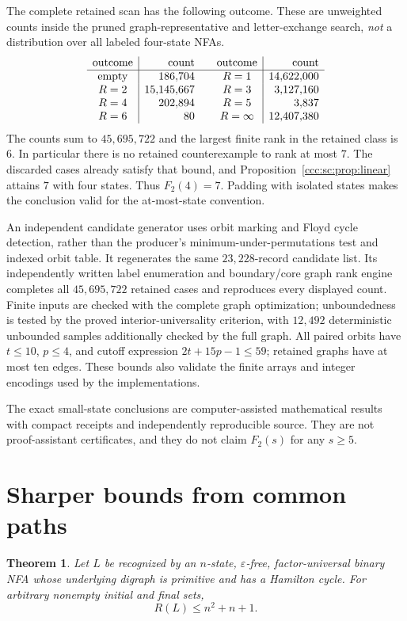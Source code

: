\documentclass[11pt,letterpaper]{article}
\newtheorem{theorem}{Theorem}[section]
\theoremstyle{definition}
\theoremstyle{remark}
\newcommand{\eps}{\varepsilon}
\begin{document}
The complete retained scan has the following outcome. These are unweighted counts inside the pruned graph-representative and letter-exchange search, \emph{not} a distribution over all labeled four-state NFAs.
\[
\begin{array}{c|r@{\qquad}c|r}
\text{outcome}&\text{count}&\text{outcome}&\text{count}\\\hline
\text{empty}&186{,}704&R=1&14{,}622{,}000\\
R=2&15{,}145{,}667&R=3&3{,}127{,}160\\
R=4&202{,}894&R=5&3{,}837\\
R=6&80&R=\infty&12{,}407{,}380
\end{array}
\]
The counts sum to $45{,}695{,}722$ and the largest finite rank in the retained class is $6$. In particular there is no retained counterexample to rank at most $7$. The discarded cases already satisfy that bound, and Proposition~\ref{ccc:sc:prop:linear} attains $7$ with four states. Thus $F_2(4)=7$. Padding with isolated states makes the conclusion valid for the at-most-state convention.

An independent candidate generator uses orbit marking and Floyd cycle detection, rather than the producer's minimum-under-permutations test and indexed orbit table. It regenerates the same $23{,}228$-record candidate list. Its independently written label enumeration and boundary/core graph rank engine completes all $45{,}695{,}722$ retained cases and reproduces every displayed count. Finite inputs are checked with the complete graph optimization; unboundedness is tested by the proved interior-universality criterion, with $12{,}492$ deterministic unbounded samples additionally checked by the full graph. All paired orbits have $t\le10$, $p\le4$, and cutoff expression $2t+15p-1\le59$; retained graphs have at most ten edges. These bounds also validate the finite arrays and integer encodings used by the implementations.

The exact small-state conclusions are computer-assisted mathematical results with compact receipts and independently reproducible source. They are not proof-assistant certificates, and they do not claim $F_2(s)$ for any $s\ge5$.

\section{Sharper bounds from common paths}\label{ccc:sc:sec:restricted}

\begin{theorem}\label{ccc:sc:thm:hamiltonian}
Let $L$ be recognized by an $n$-state, $\eps$-free, factor-universal binary NFA whose underlying digraph is primitive and has a Hamilton cycle. For arbitrary nonempty initial and final sets,
\[
 \boxed{R(L)\le n^2+n+1.}
\]
\end{theorem}
\end{document}
